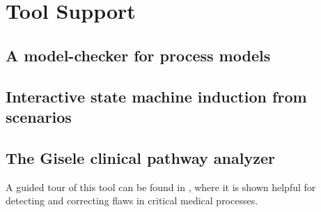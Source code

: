 \chapter{Tool Support\label{chapter:tool-support}}

\section{A model-checker for process models\label{section:tool-model-checker}}

\section{Interactive state machine induction from scenarios}

\section{The Gisele clinical pathway analyzer\label{section:tool-clinical-pathway-analyzer}}

A guided tour of this tool can be found in \cite{Damas:2011}, where it is shown helpful for detecting and correcting flaws in critical medical processes.
